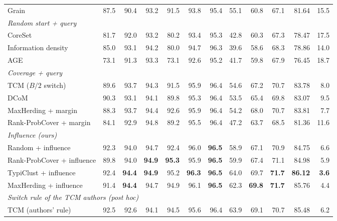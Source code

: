 \begin{table}[t]
\begin{adjustbox}{max width=\textwidth}
\begin{tabular}{lrrrrrrrrrrr}
\quad Grain~\cite{zhang2021grain} & 87.5 & 90.4 & 93.2 & 91.5 & 93.8 & 95.4 & 55.1 & 60.8 & 67.1 & 81.64 & 15.5 \\
\multicolumn{12}{l}{\textit{Random start + query}} \\
\quad CoreSet~\cite{sener2017active} & 81.7 & 92.0 & 93.2 & 80.2 & 93.4 & 95.3 & 42.8 & 60.3 & 67.3 & 78.47 & 17.5 \\
\quad Information density~\cite{settles2008analysis} & 85.0 & 93.1 & 94.2 & 80.0 & 94.7 & 96.3 & 39.6 & 58.6 & 68.3 & 78.86 & 14.0 \\
\quad AGE~\cite{cai2017active} & 73.1 & 91.3 & 93.3 & 73.1 & 92.6 & 95.2 & 41.7 & 59.8 & 67.9 & 76.45 & 18.7 \\
\multicolumn{12}{l}{\textit{Coverage + query}} \\
\quad TCM ($B/2$ switch)~\cite{doucet2024bridging} & 89.6 & 93.7 & 94.3 & 91.5 & 95.9 & 96.4 & 54.6 & 67.2 & 70.7 & 83.78 & 8.0 \\
\quad DCoM~\cite{mishal2024dcom} & 90.3 & 93.1 & 94.1 & 89.8 & 95.3 & 96.4 & 53.5 & 65.4 & 69.8 & 83.07 & 9.5 \\
\quad MaxHerding + margin & 88.3 & 93.7 & 94.4 & 92.6 & 95.9 & 96.4 & 54.2 & 68.0 & 70.7 & 83.81 & 7.7 \\
\quad Rank-ProbCover + margin & 84.1 & 92.9 & 94.8 & 89.2 & 95.5 & 96.4 & 47.2 & 63.7 & 68.5 & 81.36 & 11.6 \\
\multicolumn{12}{l}{\textit{Influence (ours)}} \\
\quad Random + influence & 92.3 & 94.0 & 94.7 & 92.4 & 96.0 & \textbf{96.5} & 58.9 & 67.1 & 70.9 & 84.75 & 6.6 \\
\quad Rank-ProbCover + influence & 89.8 & 94.0 & \textbf{94.9} & \textbf{95.3} & 95.9 & \textbf{96.5} & 59.9 & 67.4 & 71.1 & 84.98 & 5.9 \\
\quad TypiClust + influence & 92.4 & \textbf{94.4} & \textbf{94.9} & 95.2 & \textbf{96.3} & \textbf{96.5} & 64.0 & 69.7 & \textbf{71.7} & \textbf{86.12} & \textbf{3.6} \\
\quad MaxHerding + influence & 91.4 & \textbf{94.4} & 94.7 & 94.9 & 96.1 & \textbf{96.5} & 62.3 & \textbf{69.8} & \textbf{71.7} & 85.76 & 4.4 \\
\multicolumn{12}{l}{\textit{Switch rule of the TCM authors (post hoc)}} \\
\quad TCM (authors' rule)~\cite{doucet2024bridging} & 92.5 & 92.6 & 94.1 & 94.5 & 95.6 & 96.4 & 63.9 & 69.1 & 70.7 & 85.48 & 6.2 \\
\bottomrule
\end{tabular}
\end{adjustbox}
\end{table}

